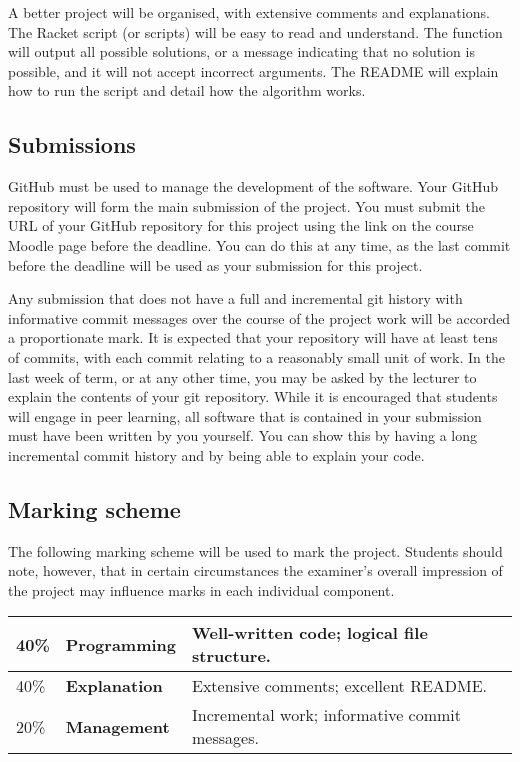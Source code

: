 A better project will be organised, with extensive comments and explanations.
The Racket script (or scripts) will be easy to read and understand.
The function will output all possible solutions, or a message indicating that no solution is possible, and it will not accept incorrect arguments.
The README will explain how to run the script and detail how the algorithm works.

\subsection*{Submissions}
GitHub must be used to manage the development of the software.
Your GitHub repository will form the main submission of the project.
You must submit the URL of your GitHub repository for this project using the link on the course Moodle page before the deadline.
You can do this at any time, as the last commit before the deadline will be used as your submission for this project.

Any submission that does not have a full and incremental git history with informative commit messages over the course of the project work will be accorded a proportionate mark.
It is expected that your repository will have at least tens of commits, with each commit relating to a reasonably small unit of work.
In the last week of term, or at any other time, you may be asked by the lecturer to explain the contents of your git repository.
While it is encouraged that students will engage in peer learning, all software that is contained in your submission must have been written by you yourself.
You can show this by having a long incremental commit history and by being able to explain your code.

\subsection*{Marking scheme}
The following marking scheme will be used to mark the project.
Students should note, however, that in certain circumstances the examiner's overall impression of the project may influence marks in each individual component.

\begin{center}
\begin{tabular}{lll}
\toprule
40\% & \textbf{Programming} & Well-written code; logical file structure.\\
\midrule
40\% & \textbf{Explanation} & Extensive comments; excellent README. \\
\midrule
20\% & \textbf{Management} & Incremental work; informative commit messages. \\
\bottomrule
\end{tabular}
\end{center}

